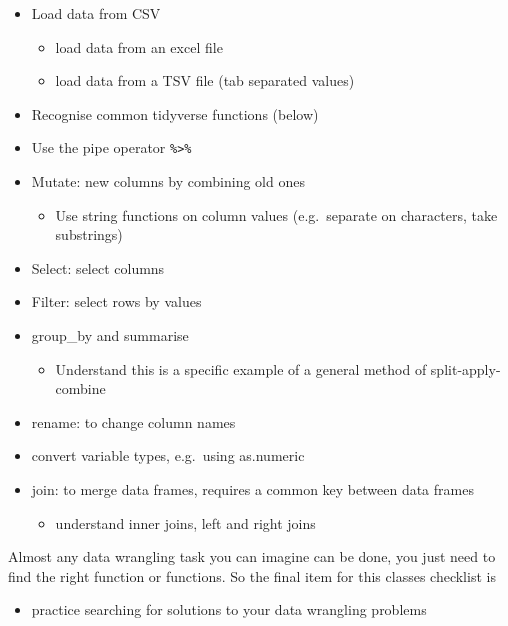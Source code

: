 \documentclass[
  12pt,
  a5paper,
]{book}
\providecommand{\tightlist}{%
  \setlength{\itemsep}{0pt}\setlength{\parskip}{0pt}}
\begin{document}
\begin{itemize}
\tightlist
\item
  Load data from CSV

  \begin{itemize}
  \tightlist
  \item
    load data from an excel file
  \item
    load data from a TSV file (tab separated values)
  \end{itemize}
\item
  Recognise common tidyverse functions (below)
\item
  Use the pipe operator \texttt{\%\textgreater{}\%}
\item
  Mutate: new columns by combining old ones

  \begin{itemize}
  \tightlist
  \item
    Use string functions on column values (e.g.~separate on characters, take substrings)
  \end{itemize}
\item
  Select: select columns
\item
  Filter: select rows by values
\item
  group\_by and summarise

  \begin{itemize}
  \tightlist
  \item
    Understand this is a specific example of a general method of split-apply-combine
  \end{itemize}
\item
  rename: to change column names
\item
  convert variable types, e.g.~using as.numeric
\item
  join: to merge data frames, requires a common key between data frames

  \begin{itemize}
  \tightlist
  \item
    understand inner joins, left and right joins
  \end{itemize}
\end{itemize}

Almost any data wrangling task you can imagine can be done, you just need to find the right function or functions. So the final item for this classes checklist is

\begin{itemize}
\tightlist
\item
  practice searching for solutions to your data wrangling problems
\end{itemize}
\end{document}
